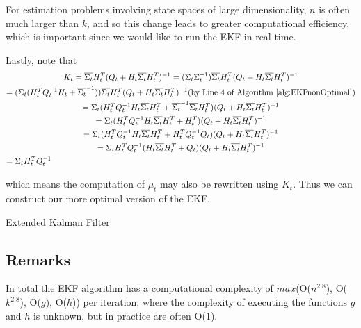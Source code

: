 For estimation problems involving state spaces of large dimensionality, \(n\) is often much larger than \(k\), and so this change leads to greater computational efficiency, which is important since we would like to run the EKF in real-time.

Lastly, note that
\begin{multline}
K_t = \overline{\Sigma_t} H_t^T (Q_t + H_t \overline{\Sigma_t} H_t^T)^{-1} = (\Sigma_t \Sigma_t^{-1}) \overline{\Sigma_t} H_t^T (Q_t + H_t \overline{\Sigma_t} H_t^T)^{-1} \\
= (\Sigma_t (H_t^T Q_t^{-1} H_t + \overline{\Sigma_t}^{-1})) \overline{\Sigma_t} H_t^T (Q_t + H_t \overline{\Sigma_t} H_t^T)^{-1} \hfill \text{(by Line 4 of Algorithm \ref{alg:EKFnonOptimal})} \\
= \Sigma_t (H_t^T Q_t^{-1} H_t \overline{\Sigma_t} H_t^T + \overline{\Sigma_t}^{-1} \overline{\Sigma_t} H_t^T) (Q_t + H_t \overline{\Sigma_t} H_t^T)^{-1} \\
= \Sigma_t (H_t^T Q_t^{-1} H_t \overline{\Sigma_t} H_t^T + H_t^T) (Q_t + H_t \overline{\Sigma_t} H_t^T)^{-1} \\
= \Sigma_t (H_t^T Q_t^{-1} H_t \overline{\Sigma_t} H_t^T + H_t^T Q_t^{-1} Q_t) (Q_t + H_t \overline{\Sigma_t} H_t^T)^{-1} \\
= \Sigma_t H_t^T Q_t^{-1} ( H_t \overline{\Sigma_t} H_t^T + Q_t) (Q_t + H_t \overline{\Sigma_t} H_t^T)^{-1} \\
= \Sigma_t H_t^T Q_t^{-1} \hfill
\end{multline}

which means the computation of \(\mu_t\) may also be rewritten using \(K_t\). Thus we can construct our more optimal version of the EKF.
\begin{algorithm} 
	\caption{Extended Kalman Filter}
	\label{alg:EKFOptimal}
	\begin{algorithmic}[1]
		\State {}
		\EndFunction
	\end{algorithmic}
\end{algorithm}

\subsection{Remarks}
In total the EKF algorithm has a computational complexity of \(max\)(O(\(n^{2.8}\)), O(\(k^{2.8}\)), O(\(g\)), O(\(h\))) per iteration, where the complexity of executing the functions \(g\) and \(h\) is unknown, but in practice are often O(\(1\)).

